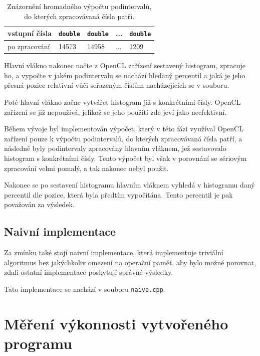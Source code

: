 \documentclass[12pt, a4paper]{article}
\let\oldsection\section
\renewcommand\section{\clearpage\oldsection}
\begin{document}
\begin{table}[!ht]
    \begin{center}
        \begin{tabular}{ | m{6.5em} | m{1.5cm}| m{1.5cm} | m{1.5cm} | m{1.5cm} | } 
             \hline
             vstupní čísla & \texttt{double} & \texttt{double} & ... & \texttt{double} \\ 

             \hline
              po zpracování &  14573 & 14958 & ... & 1209 \\  

             \hline
        \end{tabular}
    \end{center}
    \caption{\label{tab:opencl-bucket-computation}Znázornění hromadného výpočtu podintervalů, do kterých zpracovávaná čísla patří.}
\end{table}

Hlavní vlákno nakonec načte z OpenCL zařízení sestavený histogram, zpracuje ho, a vypočte v jakém podintervalu se nachází hledaný percentil a jaká je jeho přesná pozice relativní vůči seřazeným číslům nacházejících se v souboru.

Poté hlavní vlákno začne vytvářet histogram již s konkrétními čísly. OpenCL zařízení se již nepoužívá, jelikož se jeho použití zde jeví jako neefektivní.

Během vývoje byl implementován výpočet, který v této fázi využíval OpenCL zařízení pouze k výpočtu podintervalů, do kterých zpracovávaná čísla patří, a následně byly podintervaly zpracovány hlavním vláknem, jež sestavovalo histogram s konkrétními čísly.
Tento výpočet byl však v porovnání se sériovým zpracování velmi pomalý, a tak nakonec nebyl použit.

Nakonec se po sestavení histogramu hlavním vláknem vyhledá v histogramu daný percentil dle pozice, která byla předtím vypočítána.
Tento percentil je pak považován za výsledek.

\subsection{Naivní implementace}
Za zmínku také stojí naivní implementace, která implementuje triviální algoritmus bez jakýchkoliv omezení na operační paměť, aby bylo možné porovnat, zdali ostatní implementace poskytují správné výsledky.

Tato implementace se nachází v souboru \texttt{naive.cpp}.

\section{Měření výkonnosti vytvořeného programu}
\end{document}
